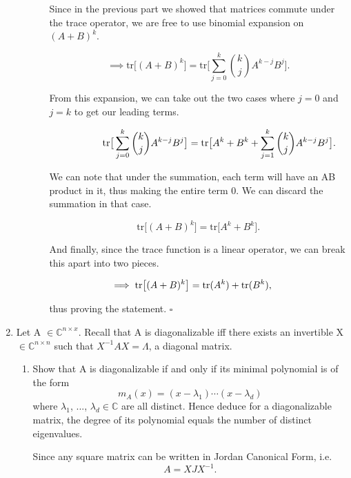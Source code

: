 \documentclass[12pt]{article}
\newcommand{\jump}{\vspace{5mm}}
\newcommand{\C}{\mathbb{C}}
\newcommand{\lm}{\lambda}
\begin{document}
\begin{enumerate}[leftmargin=\labelsep]
\begin{enumerate}
\begin{enumerate}
        \jump
        Since in the previous part we showed that matrices commute under the trace operator, we are free to use binomial expansion on $(A+B)^k$.

        \[
        \implies \text{tr}\big[ (A+B)^k\big] = \text{tr}\big[ \sum_{j = 0}^k \binom{k}{j} A^{k - j}B^j\big].
        \]

        From this expansion, we can take out the two cases where $j = 0$ and $j = k$ to get our leading terms.

        \[
        \hspace{15mm}\text{tr}\big[ \sum_{j = 0}^k \binom{k}{j} A^{k - j}B^j\big] = \text{tr}\big[ A^k + B^k + \sum_{j = 1}^k \binom{k}{j} A^{k - j}B^j\big].
        \]

        We can note that under the summation, each term will have an AB product in it, thus making the entire term 0. We can discard the summation in that case. 

        \[
        \text{tr}\big[ (A+B)^k\big] = \text{tr}\big[A^k + B^k\big].  
        \]

        And finally, since the trace function is a linear operator, we can break this apart into two pieces.

        \[
        \hspace{-5mm}\implies \text{tr}\big[ (A+B)^k\big] = \text{tr}(A^k) + \text{tr}(B^k), 
        \]

        thus proving the statement. $\square$
        
    \end{enumerate}

\end{enumerate}

\jump
\item Let A $\in \C^{n\times x}$. Recall that A is diagonalizable iff there exists an invertible X $\in \C^{n \times n}$ such that $X^{-1}AX = \Lambda$, a diagonal matrix.
\begin{enumerate}
    \item Show that A is diagonalizable if and only if its minimal polynomial is of the form 
    \[
    m_A(x) = (x - \lm_1)\cdots(x - \lm_d)
    \]
    where $\lm_1$, ..., $\lm_d \in \C$ are all distinct. Hence deduce for a diagonalizable matrix, the degree of its polynomial equals the number of distinct eigenvalues.

\jump
Since any square matrix can be written in Jordan Canonical Form, i.e. 
\[
A = XJX^{-1}.
\]


\end{enumerate}
\end{enumerate}
\end{document}
